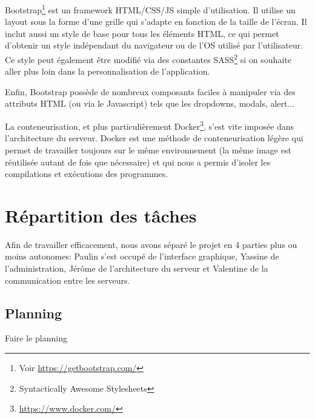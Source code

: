\par Bootstrap\footnote{Voir \url{https://getbootstrap.com/}} est un framework HTML/CSS/JS simple d'utilisation. Il utilise un layout sous la forme d'une grille qui s'adapte en fonction de la taille de l'écran. Il inclut aussi un style de base pour tous les éléments HTML, ce qui permet d'obtenir un style indépendant du navigateur ou de l'OS utilisé par l'utilisateur. Ce style peut également être modifié via des constantes SASS\footnote{Syntactically Awesome Stylesheets} si on souhaite aller plus loin dans la personnalisation de l'application. 
\par Enfin, Bootstrap possède de nombreux composants faciles à manipuler via des attributs HTML (ou via le Javascript) tels que les dropdowns, modals, alert... \\



\par La conteneurisation, et plus particulièrement Docker\footnote{\url{https://www.docker.com/}}, s'est vite imposée dans l'architecture du serveur. Docker est une méthode de conteneurisation légère qui permet de travailler toujours sur le même environnement (la même image est réutilisée autant de fois que nécessaire) et qui nous a permis d'isoler les compilations et exécutions des programmes.

\section{Répartition des tâches}

\par Afin de travailler efficacement, nous avons séparé le projet en 4 parties plus ou moins autonomes: Paulin s'est occupé de l'interface graphique, Yassine de l'administration, Jérôme de l'architecture du serveur et Valentine de la communication entre les serveurs.

\subsection{Planning}

Faire le planning
